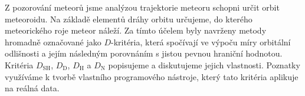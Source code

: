 Z pozorování meteorů jsme analýzou trajektorie meteoru schopni určit orbit meteoroidu. Na základě elementů dráhy orbitu určujeme, do kterého meteorického roje meteor náleží. Za tímto účelem byly navrženy metody hromadně označované jako $D$-kritéria, která spočívají ve výpoču míry orbitální odlišnosti a jejím následným porovnáním s jistou pevnou hraniční hodnotou. Kritéria $D_\text{SH}$, $D_\text{D}$, $D_\text{H}$ a $D_\text{N}$ popisujeme a diskutujeme jejich vlastnosti. Poznatky využíváme k tvorbě vlastního programového nástroje, který tato kritéria aplikuje na reálná data.